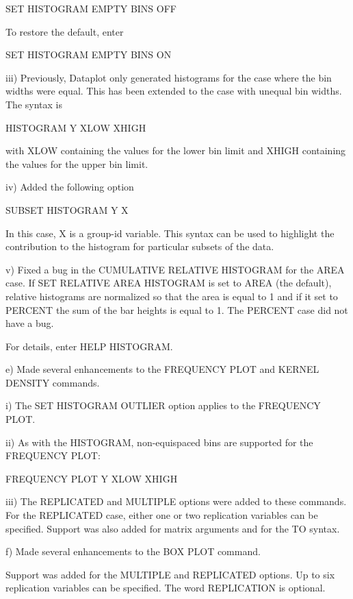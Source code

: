 {                  SET HISTOGRAM EMPTY BINS OFF

             To restore the default, enter

                  SET HISTOGRAM EMPTY BINS ON

       iii) Previously, Dataplot only generated histograms for the case
            where the bin widths were equal.  This has been extended
            to the case with unequal bin widths.  The syntax is

                HISTOGRAM Y XLOW XHIGH

            with XLOW containing the values for the lower bin limit
            and XHIGH containing the values for the upper bin limit.

        iv) Added the following option

                SUBSET HISTOGRAM Y X

            In this case, X is a group-id variable.  This syntax
            can be used to highlight the contribution to the
            histogram for particular subsets of the data.

         v) Fixed a bug in the CUMULATIVE RELATIVE HISTOGRAM
            for the AREA case.  If SET RELATIVE AREA HISTOGRAM
            is set to AREA (the default), relative histograms
            are normalized so that the area is equal to 1 and
            if it set to PERCENT the sum of the bar heights is
            equal to 1.  The PERCENT case did not have a bug.

       For details, enter HELP HISTOGRAM.

    e) Made several enhancements to the FREQUENCY PLOT and
       KERNEL DENSITY commands.

          i) The SET HISTOGRAM OUTLIER option applies to the
             FREQUENCY PLOT.

         ii) As with the HISTOGRAM, non-equispaced bins are
             supported for the FREQUENCY PLOT:

                 FREQUENCY PLOT Y XLOW XHIGH

        iii) The REPLICATED and MULTIPLE options were added
             to these commands.  For the REPLICATED case, either
             one or two replication variables can be specified.
             Support was also added for matrix arguments and
             for the TO syntax.

    f) Made several enhancements to the BOX PLOT command.

       Support was added for the MULTIPLE and REPLICATED
       options.  Up to six replication variables can be
       specified.  The word REPLICATION is optional.

}
